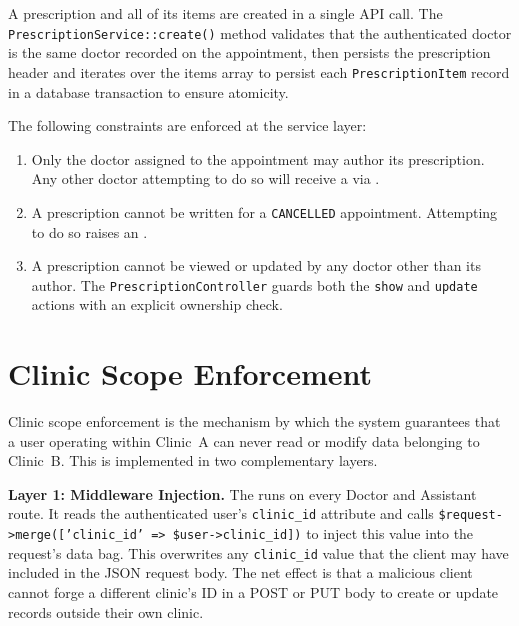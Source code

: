 A prescription and all of its items are created in a single API call.
The \texttt{PrescriptionService::create()} method validates that the
authenticated doctor is the same doctor recorded on the appointment,
then persists the prescription header and iterates over the items array
to persist each \texttt{PrescriptionItem} record in a database
transaction to ensure atomicity.

The following constraints are enforced at the service layer:

\begin{enumerate}
  \item Only the doctor assigned to the appointment may author its
    prescription. Any other doctor attempting to do so will receive a
    \stforbid{} via .
  \item A prescription cannot be written for a
    \texttt{CANCELLED} appointment. Attempting to do so raises an
    .
  \item A prescription cannot be viewed or updated by any doctor other
    than its author. The \texttt{PrescriptionController} guards both
    the \texttt{show} and \texttt{update} actions with an explicit
    ownership check.
\end{enumerate}

\section{Clinic Scope Enforcement}
\label{sec:clinic-scope}

Clinic scope enforcement is the mechanism by which the system guarantees
that a user operating within Clinic~A can never read or modify data
belonging to Clinic~B. This is implemented in two complementary layers.

\textbf{Layer 1: Middleware Injection.}
The  runs on every Doctor and Assistant
route. It reads the authenticated user's \texttt{clinic\_id} attribute
and calls \texttt{\$request->merge(['clinic\_id' => \$user->clinic\_id])}
to inject this value into the request's data bag. This overwrites any
\texttt{clinic\_id} value that the client may have included in the JSON
request body. The net effect is that a malicious client cannot forge a
different clinic's ID in a POST or PUT body to create or update records
outside their own clinic.

